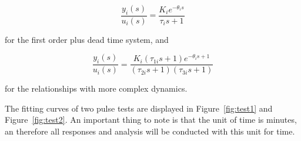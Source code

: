 \begin{equation}
	\frac{y_i(s)}{u_i(s)} = \frac{K_i e^{-\theta_is}}{\tau_i s + 1}
\end{equation}

for the first order plus dead time system, and 

\begin{equation}
	\frac{y_i(s)}{u_i(s)} = \frac{K_i (\tau_{1i}s + 1) e ^{-\theta_is +1}}{(\tau_{2i}s +1)(\tau_{3i}s +1)}
\end{equation}

for the relationships with more complex dynamics.

The fitting curves of two pulse tests are displayed in Figure~\ref{fig:test1} and Figure~\ref{fig:test2}. An important thing to note is that the unit of time is minutes, an therefore all responses and analysis will be conducted with this unit for time.


